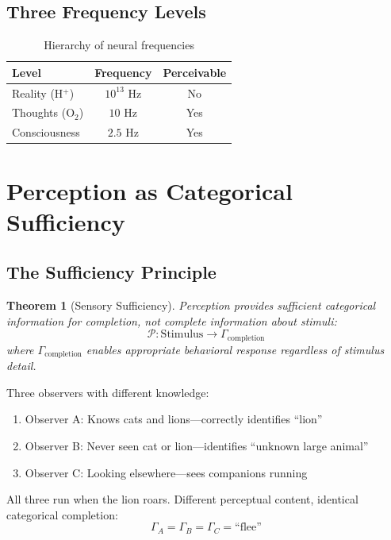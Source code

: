 \documentclass[aps,prd,twocolumn,superscriptaddress,floatfix,nofootinbib]{revtex4-2}
\newtheorem{theorem}{Theorem}[section]
\theoremstyle{remark}
\newcommand{\Pcat}{\mathcal{P}}
\newcommand{\Gstate}{\Gamma}
\begin{document}
\subsection{Three Frequency Levels}

\begin{table}[h]
\centering
\caption{Hierarchy of neural frequencies}
\label{tab:frequencies}
\begin{tabular}{@{}lcc@{}}
\toprule
Level & Frequency & Perceivable \\
\midrule
Reality (H$^+$) & $10^{13}$ Hz & No \\
Thoughts (O$_2$) & $10$ Hz & Yes \\
Consciousness & $2.5$ Hz & Yes \\
\bottomrule
\end{tabular}
\end{table}

\section{Perception as Categorical Sufficiency}
\label{sec:perception}

\subsection{The Sufficiency Principle}

\begin{theorem}[Sensory Sufficiency]
\label{thm:sufficiency}
Perception provides \emph{sufficient} categorical information for completion, not \emph{complete} information about stimuli:
\begin{equation}
\Pcat: \text{Stimulus} \to \Gstate_{\text{completion}}
\end{equation}
where $\Gstate_{\text{completion}}$ enables appropriate behavioral response regardless of stimulus detail.
\end{theorem}

\begin{example}
Three observers with different knowledge:
\begin{enumerate}
\item Observer A: Knows cats and lions---correctly identifies ``lion''
\item Observer B: Never seen cat or lion---identifies ``unknown large animal''
\item Observer C: Looking elsewhere---sees companions running
\end{enumerate}
All three run when the lion roars. Different perceptual content, identical categorical completion:
\begin{equation}
\Gstate_A = \Gstate_B = \Gstate_C = \text{``flee''}
\end{equation}
\end{example}
\end{document}
